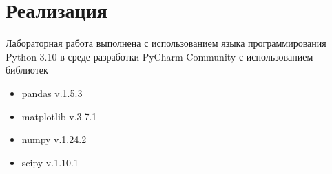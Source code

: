 \section{Реализация}
Лабораторная работа выполнена с использованием языка программирования Python 3.10 в среде разработки PyCharm Community с использованием библиотек

\begin{itemize}
	\item pandas v.1.5.3 
	\item matplotlib v.3.7.1
	\item numpy v.1.24.2
	\item scipy v.1.10.1
\end{itemize}

\newpage
